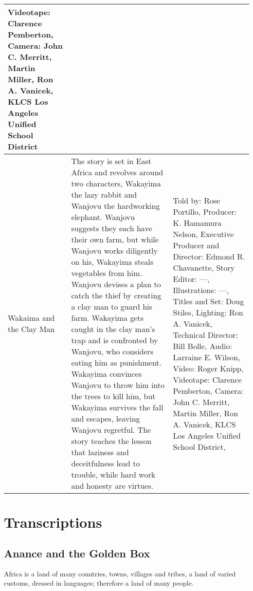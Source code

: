 \begin{table}[h]
\begin{small}
\begin{tabular}{|p{1.5cm}|p{8.5cm}|p{7cm}|}
            Videotape: Clarence Pemberton,
            Camera: John C. Merritt, Martin Miller, Ron A. Vanicek,
            KLCS Los Angeles Unified School District
            \\
            \hline
            Wakaima and the Clay Man
                                 &
            The story is set in East Africa and revolves around two characters, Wakayima the lazy rabbit and Wanjovu the hardworking elephant.
            Wanjovu suggests they each have their own farm, but while Wanjovu works diligently on his, Wakayima steals vegetables from him.
            Wanjovu devises a plan to catch the thief by creating a clay man to guard his farm.
            Wakayima gets caught in the clay man's trap and is confronted by Wanjovu, who considers eating him as punishment.
            Wakayima convinces Wanjovu to throw him into the trees to kill him, but Wakayima survives the fall and escapes, leaving Wanjovu regretful.
            The story teaches the lesson that laziness and deceitfulness lead to trouble, while hard work and honesty are virtues.
                                 &
            Told by: Rose Portillo,
            Producer: K. Hamamura Nelson,
            Executive Producer and Director: Edmond R. Chavanette,
            Story Editor: ---,
            Illustrations: ---,
            Titles and Set: Doug Stiles,
            Lighting: Ron A. Vanicek,
            Technical Director: Bill Bolle,
            Audio: Larraine E. Wilson,
            Video: Roger Knipp,
            Videotape: Clarence Pemberton,
            Camera: John C. Merritt, Martin Miller, Ron A. Vanicek,
            KLCS Los Angeles Unified School District,
            \\
            \hline
        \end{tabular}
    \end{small}

\end{table}

\clearpage
\newpage

\section{Transcriptions}

\subsection{Anance and the Golden Box}

Africa is a land of many countries, towns, villages and tribes, a land of varied customs, dressed in languages; therefore a land of many people.

